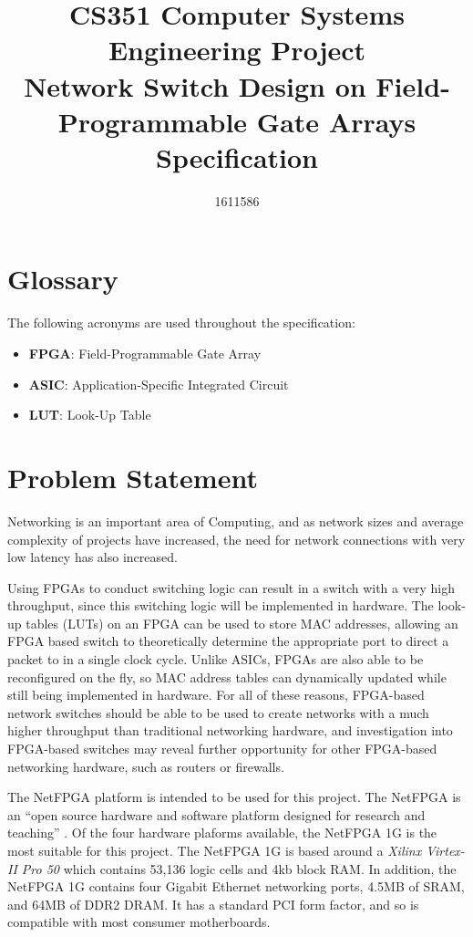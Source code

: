 \documentclass[12pt, a4paper, twoside, onecolumn]{article}
\title{CS351 Computer Systems Engineering Project \\ \vspace{0.5cm} Network Switch Design on Field-Programmable Gate Arrays \\ \vspace{0.3cm} \Large{Specification}}
\author{1611586}
\begin{document}


\tableofcontents
\newpage

\section{Glossary}
\label{glossary}
The following acronyms are used throughout the specification:
\begin{itemize}
  \item \textbf{FPGA}: Field-Programmable Gate Array
  \item \textbf{ASIC}: Application-Specific Integrated Circuit
  \item \textbf{LUT}: Look-Up Table
\end{itemize}

\section{Problem Statement}
\label{problem_statement}
Networking is an important area of Computing, and as network sizes and average complexity of projects have increased,
the need for network connections with very low latency has also increased.

Using FPGAs to conduct switching logic can result in a switch with a very high throughput, since this switching logic will be implemented in hardware. The look-up tables (LUTs) on an FPGA can be used to store MAC addresses, allowing an FPGA based switch to theoretically determine the appropriate port to direct a packet to in a single clock cycle. Unlike ASICs, FPGAs are also able to be reconfigured on the fly, so MAC address tables can dynamically updated while still being implemented in hardware.
For all of these reasons, FPGA-based network switches should be able to be used to create networks with a much higher throughput than traditional networking hardware, and investigation into FPGA-based switches may reveal further opportunity for other FPGA-based networking hardware, such as routers or firewalls.

The NetFPGA \cite{NetFPGA} platform is intended to be used for this project. The NetFPGA is an ``open source hardware and software platform designed for research and teaching'' \cite{NetFPGA_about}. Of the four hardware plaforms available, the NetFPGA 1G \cite{NetFPGA_1G} is the most suitable for this project. The NetFPGA 1G is based around a \textit{Xilinx Virtex-II Pro 50} \cite{virtex2-pro} which contains 53,136 logic cells and 4kb block RAM. In addition, the NetFPGA 1G contains four Gigabit Ethernet networking ports, 4.5MB of SRAM, and 64MB of DDR2 DRAM. It has a standard PCI form factor, and so is compatible with most consumer motherboards.
\end{document}
